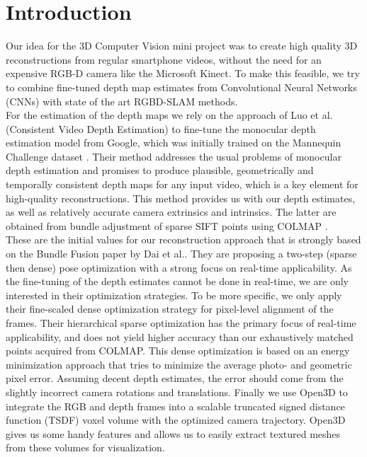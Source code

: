 \chapter{Introduction}
    Our idea for the 3D Computer Vision mini project was to create high quality 3D reconstructions from regular smartphone videos, without the need for an expensive RGB-D camera like the Microsoft Kinect.
    To make this feasible, we try to combine fine-tuned depth map estimates from Convolutional Neural Networks (CNNs) with state of the art RGBD-SLAM methods.\\
    For the estimation of the depth maps we rely on the approach of Luo et al. \cite{luo2020consistent} (Consistent Video Depth Estimation) to fine-tune the monocular depth estimation model from Google, which was initially trained on the Mannequin Challenge dataset \cite{mannequin}.
    Their method addresses the usual problems of monocular depth estimation and promises to produce plausible, geometrically and temporally consistent depth maps for any input video, which is a key element for high-quality reconstructions.
    This method provides us with our depth estimates, as well as relatively accurate camera extrinsics and intrinsics. The latter are obtained from bundle adjustment of sparse SIFT points using COLMAP \cite{colmap}.\\
    These are the initial values for our reconstruction approach that is strongly based on the Bundle Fusion paper \cite{dai2017bundlefusion} by Dai et al..
    They are proposing a two-step (sparse then dense) pose optimization with a strong focus on real-time applicability.
    As the fine-tuning of the depth estimates cannot be done in real-time, we are only interested in their optimization strategies.
    To be more specific, we only apply their fine-scaled dense optimization strategy for pixel-level alignment of the frames. Their hierarchical sparse optimization has the primary focus of real-time applicability, and does not yield higher accuracy than our exhaustively matched points acquired from COLMAP.
    This dense optimization is based on an energy minimization approach that tries to minimize the average photo- and geometric pixel error. Assuming decent depth estimates, the error should come from the slightly incorrect camera rotations and translations.
    Finally we use Open3D \cite{open3d} to integrate the RGB and depth frames into a scalable truncated signed distance function (TSDF) voxel volume with the optimized camera trajectory. Open3D gives us some handy features and allows us to easily extract textured meshes from these volumes for visualization.
